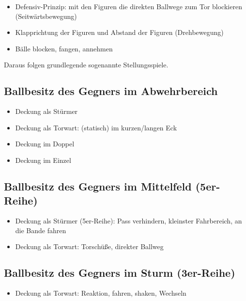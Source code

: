 \begin{itemize}
\item Defensiv-Prinzip: mit den Figuren die direkten Ballwege zum Tor blockieren (Seitwärtsbewegung)  
\item Klapprichtung der Figuren und Abstand der Figuren (Drehbewegung)
\item Bälle blocken, fangen, annehmen 
\end{itemize}
Daraus folgen grundlegende sogenannte Stellungsspiele.


\subsection{Ballbesitz des Gegners im Abwehrbereich}
\label{technik:defensive:gegnerabwehr}

\begin{itemize}
\item Deckung als Stürmer
\item Deckung als Torwart: (statisch) im kurzen/langen Eck
\item Deckung im Doppel
\item Deckung im Einzel
\end{itemize}


\subsection{Ballbesitz des Gegners im Mittelfeld (5er-Reihe)}
\label{technik:defensive:gegnermittelfeld}

\begin{itemize}
\item Deckung als Stürmer (5er-Reihe): Pass verhindern, kleinster Fahrbereich, an die Bande fahren
\item Deckung als Torwart: Torschüße, direkter Ballweg
\end{itemize}


\subsection{Ballbesitz des Gegners im Sturm (3er-Reihe)}
\label{technik:defensive:gegnersturm}

\begin{itemize}
\item Deckung als Torwart: Reaktion, fahren, shaken, Wechseln
\end{itemize}

